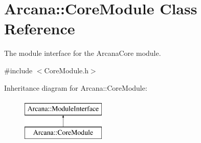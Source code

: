 \hypertarget{class_arcana_1_1_core_module}{}\section{Arcana\+:\+:Core\+Module Class Reference}
\label{class_arcana_1_1_core_module}


The module interface for the Arcana\+Core module.  




{\ttfamily \#include $<$Core\+Module.\+h$>$}

Inheritance diagram for Arcana\+:\+:Core\+Module\+:\begin{figure}[H]
\begin{center}
\leavevmode
\includegraphics[height=2.000000cm]{class_arcana_1_1_core_module}
\end{center}
\end{figure}
